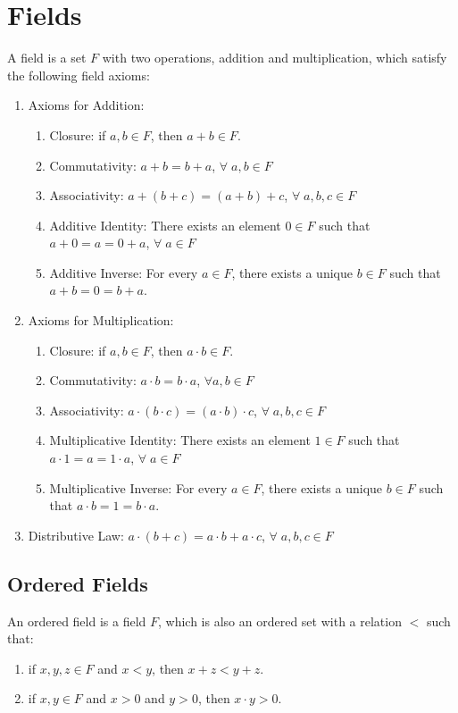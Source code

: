 \documentclass[12pt, oneside]{book}
\theoremstyle{definition}
\begin{document}
\section{Fields}
A field is a set \(F\) with two operations, addition and multiplication, which satisfy the following field axioms:
\begin{enumerate}
	\item Axioms for Addition:
	      \begin{enumerate}
		      \item Closure: if \(a,b \in F\), then \(a+b \in F\).
		      \item Commutativity: \(a+b = b+a\), \(\forall \; a,b \in F\)
		      \item Associativity: \(a+(b+c) = (a+b)+c\), \(\forall \; a,b,c \in F\)
		      \item Additive Identity: There exists an element \(0 \in F\) such that \(a+0 = a = 0+a\), \(\forall \; a \in F\)
		      \item Additive Inverse: For every \(a \in F\), there exists a unique \(b \in F\) such that \(a+b = 0 = b+a\).
	      \end{enumerate}
	\item Axioms for Multiplication:
	      \begin{enumerate}
		      \item Closure: if \(a,b \in F\), then \(a \cdot b \in F\).
		      \item Commutativity: \(a \cdot b = b \cdot a\), \(\forall a,b \in F\)
		      \item Associativity: \(a \cdot (b \cdot c) = (a \cdot b) \cdot c\), \(\forall \; a,b,c \in F\)
		      \item Multiplicative Identity: There exists an element \(1 \in F\) such that \(a \cdot 1 = a = 1 \cdot a\), \(\forall \; a \in F\)
		      \item Multiplicative Inverse: For every \(a \in F\), there exists a unique \(b \in F\) such that \(a \cdot b = 1 = b \cdot a\).
	      \end{enumerate}
	\item Distributive Law: \(a \cdot (b+c) = a \cdot b + a \cdot c\), \(\forall \; a,b,c \in F\)
\end{enumerate}

\subsection{Ordered Fields}
An ordered field is a field \(F\), which is also an ordered set with a relation \(<\) such that:
\begin{enumerate}
	\item if \(x,y,z \in F\) and \(x < y\), then \(x+z < y+z\).
	\item if \(x,y \in F\) and \(x > 0\) and \(y > 0\), then \(x \cdot y > 0\).
\end{enumerate}
\end{document}
